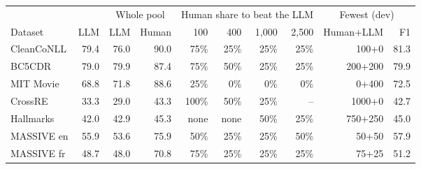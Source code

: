 \begin{tabular}{lrrrrrrrrr}
\toprule
 & & \multicolumn{2}{c}{Whole pool} & \multicolumn{4}{c}{Human share to beat the LLM} & \multicolumn{2}{c}{Fewest (dev)} \\
Dataset & LLM & LLM & Human & 100 & 400 & 1{,}000 & 2{,}500 & Human+LLM & F1 \\
\midrule
CleanCoNLL & 79.4 & 76.0 & 90.0 & 75\% & 25\% & 25\% & 25\% & 100+0 & 81.3 \\
BC5CDR & 79.0 & 79.9 & 87.4 & 75\% & 50\% & 25\% & 25\% & 200+200 & 79.9 \\
MIT Movie & 68.8 & 71.8 & 88.6 & 25\% & 0\% & 0\% & 0\% & 0+400 & 72.5 \\
CrossRE & 33.3 & 29.0 & 43.3 & 100\% & 50\% & 25\% & -- & 1000+0 & 42.7 \\
Hallmarks & 42.0 & 42.9 & 45.3 & none & none & 50\% & 25\% & 750+250 & 45.0 \\
MASSIVE en & 55.9 & 53.6 & 75.9 & 50\% & 25\% & 25\% & 50\% & 50+50 & 57.9 \\
MASSIVE fr & 48.7 & 48.0 & 70.8 & 75\% & 25\% & 25\% & 25\% & 75+25 & 51.2 \\
\bottomrule
\end{tabular}
